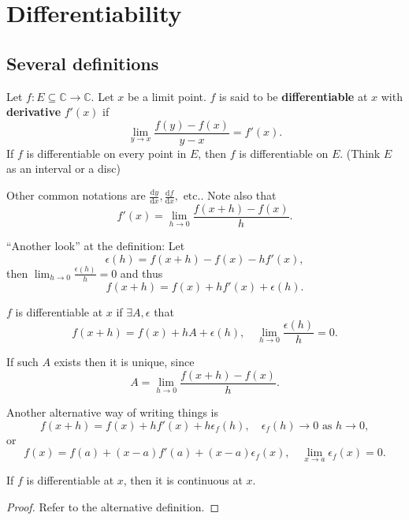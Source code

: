 \section{Differentiability}
\subsection{Several definitions}
\begin{definition}
    Let $ f:E \subseteq \mathbb{C} \to \mathbb{C}  $. Let $ x $ be a limit point. $f$ is said to be \textbf{differentiable} at $x$ with \textbf{derivative} $f'(x)$ if 
    \[
        \lim_{y \to x} \frac{f(y)-f(x)}{y-x} = f'(x).
    \]
    If $f$ is differentiable on every point in $E$, then $f$ is differentiable on $E$. (Think $E$ as an interval or a disc)
\end{definition}
\begin{remark}
    Other common notations are $\frac{\mathrm{d}y}{\mathrm{d}x},\frac{\mathrm{d}f}{\mathrm{d}x},\text{ etc.}  $.
    Note also that 
    \[
        f'(x) = \lim_{h \to 0} \frac{f(x+h)-f(x)}{h}.
    \]
\end{remark}
\begin{remark}
    ``Another look'' at the definition: Let 
    \[
        \epsilon(h) = f(x+h)-f(x)-hf'(x),
    \]
    then $ \lim_{h \to 0} \frac{\epsilon(h)}{h}=0 $ and thus 
    \[
        f(x+h) = f(x)+hf'(x)+\epsilon(h).
    \]
\end{remark}
\begin{definition}
    $f$ is differentiable at $x$ if $ \exists A,\epsilon $ that 
    \[
        f(x+h) = f(x)+hA+\epsilon(h),\quad \lim_{h \to 0} \frac{\epsilon(h)}{h}=0.
    \]
\end{definition}
\begin{note}
    If such $A$ exists then it is unique, since 
    \[
        A = \lim_{h \to 0} \frac{f(x+h)-f(x)}{h}. 
    \]
\end{note}
\begin{remark}
    Another alternative way of writing things is 
    \[
        f(x+h) = f(x)+hf'(x)+h\epsilon_f(h),\quad \epsilon_f(h)\to 0 \text{ as }h\to 0,
    \]
    or 
    \[
        f(x) = f(a)+(x-a)f'(a)+(x-a)\epsilon_f(x), \quad \lim_{x \to a} \epsilon_f(x)=0.
    \]
\end{remark}
\begin{sprop}
    If $f$ is differentiable at $x$, then it is continuous at $x$. 
\end{sprop}
\begin{proof}
    Refer to the alternative definition.
\end{proof}

